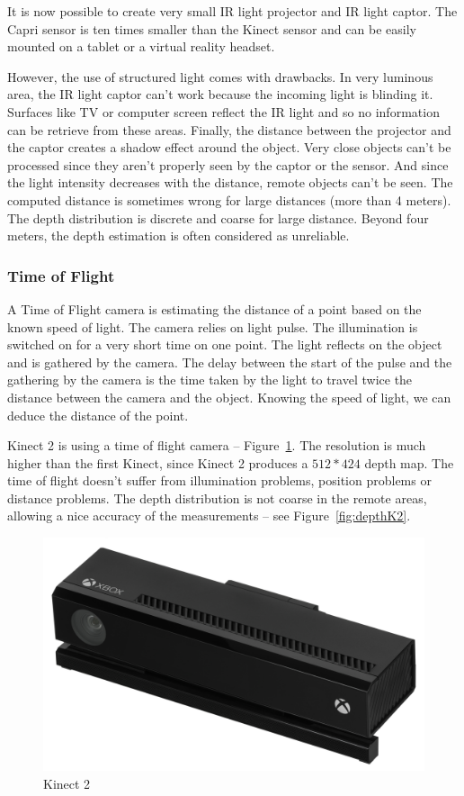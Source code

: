 \documentclass[12pt, twoside]{article}
\begin{document}
It is now possible to create very small IR light projector and IR light captor. The Capri sensor is ten times smaller than the Kinect sensor and can be easily mounted on a tablet or a virtual reality headset.

However, the use of structured light comes with drawbacks. In very luminous area, the IR light captor can't work because the incoming light is blinding it. Surfaces like TV or computer screen reflect the IR light and so no information can be retrieve from these areas. Finally, the distance between the projector and the captor creates a shadow effect around the object. Very close objects can't be processed since they aren't properly seen by the captor or the sensor. And since the light intensity decreases with the distance, remote objects can't be seen. The computed distance is sometimes wrong for large distances (more than 4 meters). The depth distribution is discrete and coarse for large distance. Beyond four meters, the depth estimation is often considered as unreliable.

\subsubsection{Time of Flight}
A Time of Flight camera is estimating the distance of a point based on the known speed of light. The camera relies on light pulse. The illumination is switched on for a very short time on one point. The light reflects on the object and is gathered by the camera. The delay between the start of the pulse and the gathering by the camera is the time taken by the light to travel twice the distance between the camera and the object. Knowing the speed of light, we can deduce the distance of the point.

Kinect 2 is using a time of flight camera -- Figure~\ref{fig:kinect2}. The resolution is much higher than the first Kinect, since Kinect 2 produces a $512*424$ depth map. The time of flight doesn't suffer from illumination problems, position problems or distance problems. The depth distribution is not coarse in the remote areas, allowing a nice accuracy of the measurements -- see Figure~\ref{fig:depthK2}.

\begin{figure}[h]
  \centering
  \includegraphics[scale=0.05]{kinect2.jpg}
  \caption{\label{fig:kinect2} Kinect 2}
\end{figure}
\end{document}
